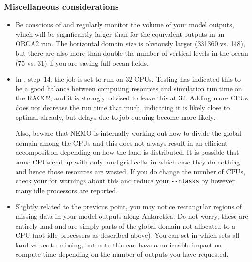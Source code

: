 \subsubsection{Miscellaneous considerations}
\label{sec:grids-eorca1-misc}

\begin{itemize}
    \item Be conscious of and regularly monitor the volume of your model outputs, which will be significantly larger than for the equivalent outputs in an ORCA2 run.
        The horizontal domain size is obviously larger (331\texttimes{}360 vs. 148), but there are also more than double the number of vertical levels in the ocean (75 vs. 31) if you are saving full ocean fields.
    \item In , step~14, the job is set to run on 32 CPUs.
        Testing has indicated this to be a good balance between computing resources and simulation run time on the RACC2, and it is strongly advised to leave this at 32.
        Adding more CPUs does not decrease the run time that much, indicating it is likely close to optimal already, but delays due to job queuing become more likely.

        Also, beware that NEMO is internally working out how to divide the global domain among the CPUs and this does not always result in an efficient decomposition depending on how the land is distributed.
        It is possible that some CPUs end up with only land grid cells, in which case they do nothing and hence those resources are wasted.
        If you do change the number of CPUs, check your  for warnings about this and reduce your \texttt{-{}-ntasks} by however many idle processors are reported.

    \item Slightly related to the previous point, you may notice rectangular regions of missing data in your model outputs along Antarctica.
    Do not worry; these are entirely land and are simply parts of the global domain not allocated to a CPU (not idle processors as described above).
    You can set  in  which sets all land values to missing, but note this can have a noticeable impact on compute time depending on the number of outputs you have requested.

\end{itemize}
